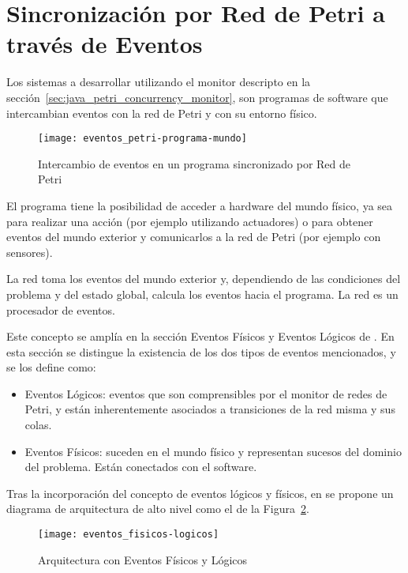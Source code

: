 \section{Sincronización por Red de Petri a través de Eventos}
\label{sec:sincronizacion_RdP_por_eventos}
Los sistemas a desarrollar utilizando el monitor descripto en la
sección~\ref{sec:java_petri_concurrency_monitor}, son programas de software que
intercambian eventos con la red de Petri y con su entorno físico.

\begin{figure}[h]
	\centering
	\texttt{[image: eventos\_petri-programa-mundo]}
	\caption{Intercambio de eventos en un programa sincronizado por Red de Petri}
	\label{fig:eventos_petri-programa-mundo}
\end{figure}

El programa tiene la posibilidad de acceder a hardware del mundo físico, ya sea
para realizar una acción (por ejemplo utilizando actuadores) o  para obtener
eventos del mundo exterior y comunicarlos a la red de Petri (por ejemplo con
sensores).

La red toma los eventos del mundo exterior y, dependiendo de las condiciones del
problema y del estado global, calcula los eventos hacia el programa.
La red es un procesador de eventos. \cite{TesisMicolini}\cite{chimp}

Este concepto se amplía en la sección Eventos Físicos y Eventos
Lógicos de \cite{chimp}. En esta sección se distingue la existencia de los dos
tipos de eventos mencionados, y se los define como:
  \begin{itemize}
    \item Eventos Lógicos: eventos que son comprensibles por el monitor de
    redes de Petri, y están inherentemente asociados a transiciones de la red
    misma y sus colas.
    \item Eventos Físicos: suceden en el mundo físico y representan sucesos del
    dominio del problema. Están conectados con el software.
  \end{itemize}

Tras la incorporación del concepto de eventos lógicos y físicos, en \cite{chimp}
se propone un diagrama de arquitectura de alto nivel como el de la
Figura~\ref{fig:eventos_fisicos-logicos}.

\begin{figure}[h]
	\centering
	\texttt{[image: eventos\_fisicos-logicos]}
	\caption{Arquitectura con Eventos Físicos y Lógicos}
	\label{fig:eventos_fisicos-logicos}
\end{figure}

